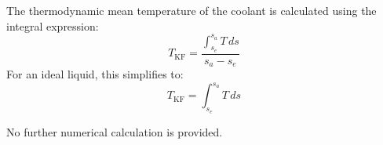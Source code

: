 The thermodynamic mean temperature of the coolant is calculated using the integral expression:  
\[
T_{\text{KF}} = \frac{\int_{s_e}^{s_a} T \, ds}{s_a - s_e}
\]  
For an ideal liquid, this simplifies to:  
\[
T_{\text{KF}} = \int_{s_e}^{s_a} T \, ds
\]  

No further numerical calculation is provided.